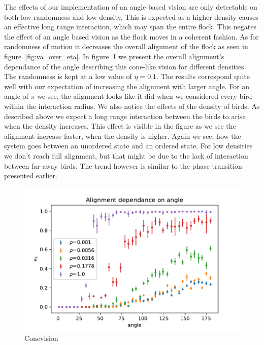 \documentclass[twoside,twocolumn]{article}
\begin{document}
The effects of our implementation of an angle based vision are only detectable on both low randomness and low density.
This is expected as a higher density causes an effective long range interaction, which may span the entire flock.
This negates the effect of an angle based vision as the flock moves in a coherent fashion.
As for randomness of motion it decreases the overall alignment of the flock as seen in figure~\ref{fig:va_over_eta}.
In figure~\ref{fig:conevision} we present the overall alignment's dependance of the angle describing this cone-like
vision for different densities. The randomness is kept at a low value of $\eta=0.1$.
The results correspond quite well with our expectation of increasing the alignment with larger angle.
For an angle of $\pi$ we see, the alignment looks like it did when we considered every bird within the interaction radius.
We also notice the effects of the density of birds. As described above we expect a long range interaction
between the birds to arise when the density increases.
This effect is visible in the figure as we see the alignment increase faster, when the density is higher.
Again we see, how the system goes between an unordered state and an ordered state. For low densities we don't reach full alignment, but that might be due to the lack of interaction between far-away birds. The trend however is similar to the phase transition presented earlier.

\begin{figure}[!htb]
\begin{center}
\includegraphics[width=\columnwidth]{va_over_angle}
\end{center}
\caption{Conevision}\label{fig:conevision}
\end{figure}
\end{document}

